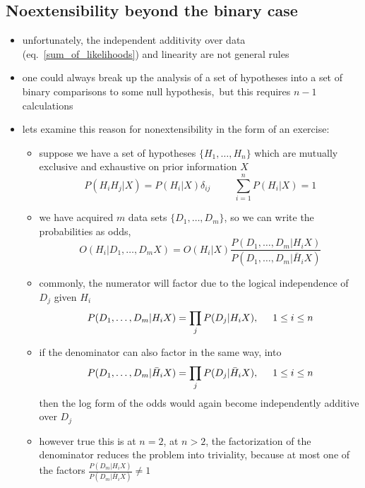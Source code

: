 \documentclass[../jaynes_prob_theory_notes.tex]{subfiles}
\begin{document}
\subsection{Noextensibility beyond the binary case}
    \begin{itemize}
        \item unfortunately, the independent additivity over data (eq.~\ref{sum_of_likelihoods}) and linearity are not general rules 
        \item one could always break up the analysis of a set of hypotheses into a set of binary comparisons to some null hypothesis,\ but this requires $n-1$ calculations
        \item lets examine this reason for nonextensibility in the form of an exercise:
            \begin{itemize}
                \item suppose we have a set of hypotheses $\{H_1, \ldots, H_n\}$ which are mutually exclusive and exhaustive on prior information $X$
                    \begin{equation*}
                        P(H_{i}H_j|X) = P(H_i|X)\delta_{ij} \hspace{1cm} \sum^{n}_{i=1} P(H_i|X) = 1
                    \end{equation*}
                \item we have acquired $m$ data sets $\{D_1, \ldots, D_m\}$, so we can write the probabilities as odds,
                    \begin{equation*}
                        O(H_i|D_1, \ldots, D_{m}X) = O(H_i|X)\frac{P(D_1, \ldots, D_m|H_{i}X)}{P(D_1, \ldots, D_m|\bar{H}_{i}X)}
                    \end{equation*}
                \item commonly, the numerator will factor due to the logical independence of $D_j$ given $H_i$
                    \begin{equation*}
                        P(D_1, \ldots, D_m|H_{i}X) = \prod_{j} P(D_j|H_{i}X), \hspace{0.5cm} 1 \leq i \leq n
                    \end{equation*}
                \item if the denominator can also factor in the same way, into 
                    \begin{equation*}
                        P(D_1, \ldots, D_m|\bar{H}_{i}X) = \prod_{j} P(D_j|\bar{H}_{i}X), \hspace{0.5cm} 1 \leq i \leq n
                    \end{equation*}
                    then the log form of the odds would again become independently additive over $D_j$
                \item however true this is at $n=2$, at $n > 2$, the factorization of the denominator reduces the problem into triviality, because at most one of the factors $\frac{P(D_m|H_{i}X)}{P(D_m|\bar{H}_{i}X)} \neq 1$
            \end{itemize}
    \end{itemize}
\end{document}

